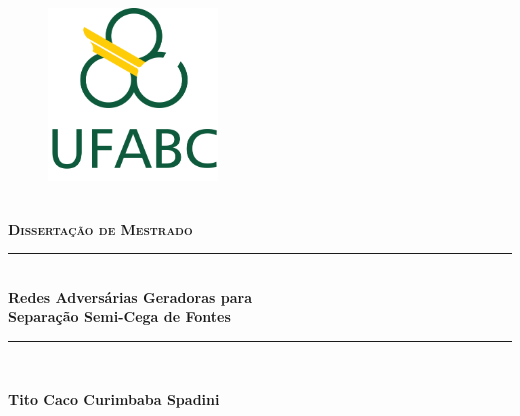 \begin{titlepage}
		\newcommand{\HRule}{\rule{\linewidth}{0.5mm}}
		
		\center 
		
		\begin{figure}
			\centering
			\includegraphics[width=0.4\textwidth]{figs/logo_ufabc.png}
		\end{figure}
		
		\\[0.5cm]
		\textsc{\textbf{\Large Dissertação de Mestrado}}\\[0.5cm] %
		
		
		\vspace{1.0cm}
		
		\HRule \\[0.4cm]
		{ \huge \bfseries Redes Adversárias Geradoras para \\[0.5cm] Separação Semi-Cega de Fontes}\\[0.25cm] %
		\HRule \\[1.0cm]
		
		\vspace{0.5cm}
		
		
		\vspace{1.0cm}
		
		\textbf{\LARGE Tito Caco Curimbaba Spadini}\\[1.0cm]
		

\end{titlepage}
